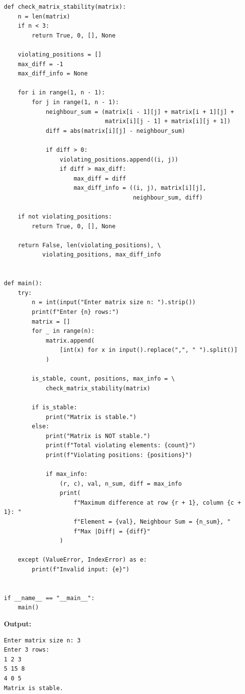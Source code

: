 \documentclass[12pt]{article}
\begin{document}
\begin{lstlisting}[style=code]
def check_matrix_stability(matrix):
    n = len(matrix)
    if n < 3:
        return True, 0, [], None

    violating_positions = []
    max_diff = -1
    max_diff_info = None

    for i in range(1, n - 1):
        for j in range(1, n - 1):
            neighbour_sum = (matrix[i - 1][j] + matrix[i + 1][j] +
                             matrix[i][j - 1] + matrix[i][j + 1])
            diff = abs(matrix[i][j] - neighbour_sum)

            if diff > 0:
                violating_positions.append((i, j))
                if diff > max_diff:
                    max_diff = diff
                    max_diff_info = ((i, j), matrix[i][j],
                                     neighbour_sum, diff)

    if not violating_positions:
        return True, 0, [], None

    return False, len(violating_positions), \
           violating_positions, max_diff_info


def main():
    try:
        n = int(input("Enter matrix size n: ").strip())
        print(f"Enter {n} rows:")
        matrix = []
        for _ in range(n):
            matrix.append(
                [int(x) for x in input().replace(",", " ").split()]
            )

        is_stable, count, positions, max_info = \
            check_matrix_stability(matrix)

        if is_stable:
            print("Matrix is stable.")
        else:
            print("Matrix is NOT stable.")
            print(f"Total violating elements: {count}")
            print(f"Violating positions: {positions}")

            if max_info:
                (r, c), val, n_sum, diff = max_info
                print(
                    f"Maximum difference at row {r + 1}, column {c + 1}: "
                    f"Element = {val}, Neighbour Sum = {n_sum}, "
                    f"Max |Diff| = {diff}"
                )

    except (ValueError, IndexError) as e:
        print(f"Invalid input: {e}")


if __name__ == "__main__":
    main()
\end{lstlisting}

\textbf{Output:}

\begin{lstlisting}[style=output]
Enter matrix size n: 3
Enter 3 rows:
1 2 3
5 15 8
4 0 5
Matrix is stable.
\end{lstlisting}
\end{document}
